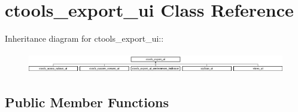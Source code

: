\hypertarget{classctools__export__ui}{
\section{ctools\_\-export\_\-ui Class Reference}
\label{classctools__export__ui}
}
Inheritance diagram for ctools\_\-export\_\-ui::\begin{figure}[H]
\begin{center}
\leavevmode
\includegraphics[height=0.918033cm]{classctools__export__ui}
\end{center}
\end{figure}
\subsection*{Public Member Functions}
